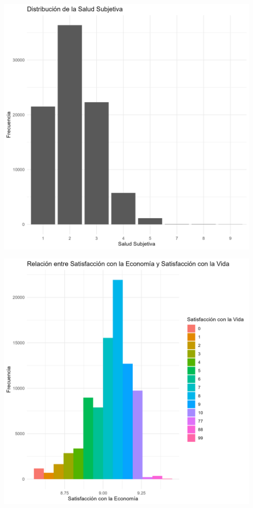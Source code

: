 \documentclass{article}\usepackage[]{graphicx}\usepackage[]{xcolor}
\makeatletter
\def\maxwidth{ %
  \ifdim\Gin@nat@width>\linewidth
    \linewidth
  \else
    \Gin@nat@width
  \fi
}
\makeatother
\begin{document}
\includegraphics[width=\maxwidth]{distribucion_salud_subjetiva} 

\includegraphics[width=\maxwidth]{relacion_satisfaccion_vida_economia} 
\end{document}
